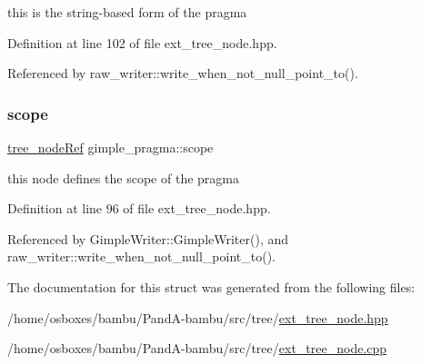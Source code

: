 this is the string-\/based form of the pragma 



Definition at line 102 of file ext\+\_\+tree\+\_\+node.\+hpp.



Referenced by raw\+\_\+writer\+::write\+\_\+when\+\_\+not\+\_\+null\+\_\+point\+\_\+to().

\mbox{\label{structgimple__pragma_a4ea6da3c9261760add67d5e5a243b18e}} 
\subsubsection{\texorpdfstring{scope}{scope}}
{\footnotesize\ttfamily \hyperlink{tree__node_8hpp_a6ee377554d1c4871ad66a337eaa67fd5}{tree\+\_\+node\+Ref} gimple\+\_\+pragma\+::scope}



this node defines the scope of the pragma 



Definition at line 96 of file ext\+\_\+tree\+\_\+node.\+hpp.



Referenced by Gimple\+Writer\+::\+Gimple\+Writer(), and raw\+\_\+writer\+::write\+\_\+when\+\_\+not\+\_\+null\+\_\+point\+\_\+to().



The documentation for this struct was generated from the following files\+:\begin{DoxyCompactItemize}
\item 
/home/osboxes/bambu/\+Pand\+A-\/bambu/src/tree/\hyperlink{ext__tree__node_8hpp}{ext\+\_\+tree\+\_\+node.\+hpp}\item 
/home/osboxes/bambu/\+Pand\+A-\/bambu/src/tree/\hyperlink{ext__tree__node_8cpp}{ext\+\_\+tree\+\_\+node.\+cpp}\end{DoxyCompactItemize}
